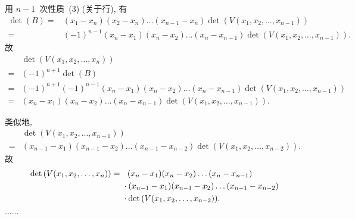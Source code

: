 \begin{example}
    用 \(n-1\)~次性质~(3) (关于行), 有
    \begin{align*}
        \det {(B)}
        = {} &
        (x_1 - x_n) (x_2- x_n) \dots (x_{n-1} - x_n)
        \det {(V(x_1, x_2, \dots, x_{n-1}))}
        \\
        = {} &
        (-1)^{n-1} (x_n - x_1) (x_n - x_2) \dots (x_n - x_{n-1})
        \det {(V(x_1, x_2, \dots, x_{n-1}))}.
    \end{align*}
    故
    \begin{align*}
             &
        \det {(V(x_1, x_2, \dots, x_n))}
        \\
        = {} &
        (-1)^{n+1} \det {(B)}
        \\
        = {} &
        (-1)^{n+1}
        (-1)^{n-1} (x_n - x_1) (x_n - x_2) \dots (x_n - x_{n-1})
        \det {(V(x_1, x_2, \dots, x_{n-1}))}
        \\
        = {} &
        (x_n - x_1) (x_n - x_2) \dots (x_n - x_{n-1})
        \det {(V(x_1, x_2, \dots, x_{n-1}))}.
    \end{align*}

    类似地,
    \begin{align*}
             &
        \det {(V(x_1, x_2, \dots, x_{n-1}))}
        \\
        = {} &
        (x_{n-1} - x_1) (x_{n-1} - x_2) \dots (x_{n-1} - x_{n-2})
        \det {(V(x_1, x_2, \dots, x_{n-2}))}.
    \end{align*}
    故
    \begin{align*}
        \det {(V(x_1, x_2, \dots, x_n))}
        = {} & \hphantom{\cdot\,\,}
        (x_n - x_1) (x_n - x_2) \dots (x_n - x_{n-1})
        \\
             & \cdot
        (x_{n-1} - x_1) (x_{n-1} - x_2) \dots (x_{n-1} - x_{n-2})
        \\
             & \cdot
        \det {(V(x_1, x_2, \dots, x_{n-2}))}.
    \end{align*}

    \(\dots \dots\)


\end{example}

